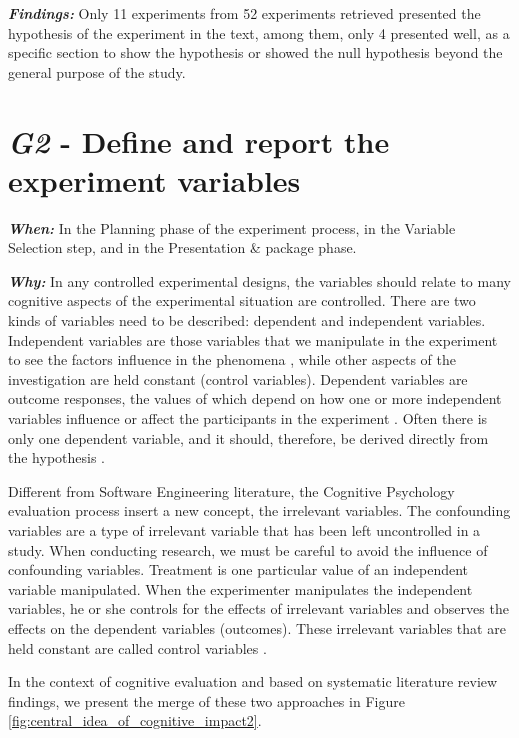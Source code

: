 \noindent \textit{\textbf{Findings:}} Only 11 experiments from 52 experiments retrieved presented the hypothesis of the experiment in the text, among them, only 4 presented well, as a specific section to show the hypothesis or showed the null hypothesis beyond the general purpose of the study.
\vspace{5mm}

\section{\textit{G2} - Define and report the experiment variables}
\label{sec:guidelines-G2}

\noindent \textit{\textbf{When:}} 
In the Planning phase of the experiment process, in the Variable Selection step, and in the Presentation \& package phase.
\vspace{5mm}

\noindent \textit{\textbf{Why:}} In any controlled experimental designs, the variables should relate to many cognitive aspects of the experimental situation are controlled. There are two kinds of variables need to be described: dependent and independent variables. Independent variables are those variables that we manipulate in the experiment to see the factors influence in the phenomena \cite{Wohlin2000}, while other aspects of the investigation are held constant (control variables). Dependent variables are outcome responses, the values of which depend on how one or more independent variables influence or affect the participants in the experiment \cite{Sternberg2011}. Often there is only one dependent variable, and it should, therefore, be derived directly from the hypothesis \cite{Wohlin2000}.

Different from Software Engineering literature, the Cognitive Psychology evaluation process insert a new concept, the irrelevant variables. The confounding variables are a type of irrelevant variable that has been left uncontrolled in a study. When conducting research, we must be careful to avoid the influence of confounding variables. Treatment is one particular value of an independent variable manipulated. When the experimenter manipulates the independent variables, he or she controls for the effects of irrelevant variables and observes the effects on the dependent variables (outcomes). These irrelevant variables that are held constant are called control variables \cite{Sternberg2011}. 

In the context of cognitive evaluation and based on systematic literature review findings, we present the merge of these two approaches in Figure \ref{fig:central_idea_of_cognitive_impact2}.

